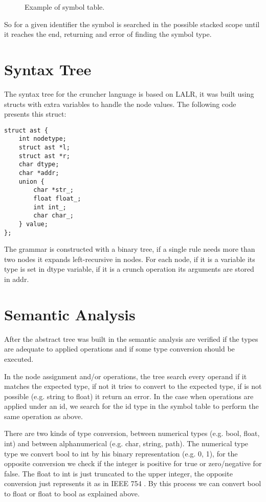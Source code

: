 \documentclass{article}
\begin{document}
\begin{figure}[ht]
\caption{Example of symbol table.}
\end {figure}

So for a given identifier the symbol is searched in the possible stacked scope
until it reaches the end, returning and error of finding the symbol type.

\section{Syntax Tree}%
\label{sec:syntax}
The syntax tree for the cruncher language is based on LALR, it was built using
structs with extra variables to handle the node values. The following code
presents this struct:

\begin{verbatim}
struct ast {
    int nodetype;
    struct ast *l;
    struct ast *r;
    char dtype;
    char *addr;
    union {
        char *str_;
        float float_;
        int int_;
        char char_;
    } value;
};
\end{verbatim}

The grammar is constructed with a binary tree, if a single rule needs more than
two nodes it expands left-recursive in nodes. For each node, if it is a
variable its type is set in dtype variable, if it is a crunch operation its
arguments are stored in addr.

\section{Semantic Analysis}
After the abstract tree was built in the semantic analysis are verified if the
types are adequate to applied operations and if some type conversion should be
executed.

In the node assignment and/or operations, the tree search every operand if it
matches the expected type, if not it tries to convert to the expected type, if
is not possible (e.g. string to float) it return an error.  In the case when
operations are applied under an id, we search for the id type in the symbol
table to perform the same operation as above.

There are two kinds of type conversion, between numerical types (e.g. bool,
float, int) and between alphanumerical (e.g. char, string, path). The numerical
type type we convert bool to int by his binary representation (e.g. 0, 1), for
the opposite conversion we check if the integer is positive for true or
zero/negative for false. The float to int is just truncated to the upper
integer, the opposite conversion just represents it as in IEEE 754
\cite{ieee754}. By this process we can convert bool to float or float to bool
as explained above.
\end{document}
